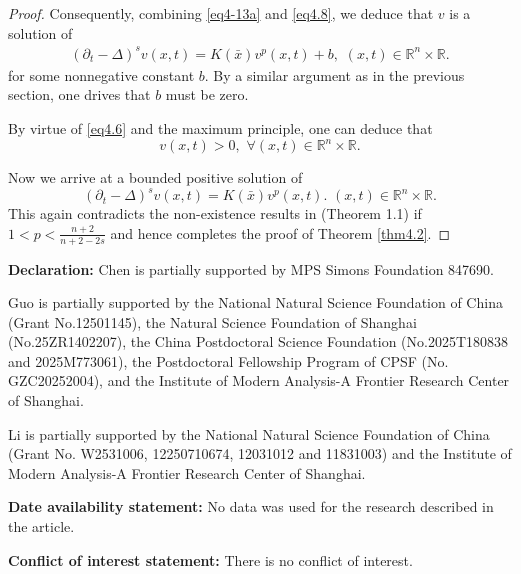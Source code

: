 \documentclass[12pt]{article}
\theoremstyle{remark}
\numberwithin{equation}{section}
\newcommand{\R}{\mathbb{R}}
\begin{document}
\begin{proof}
Consequently, combining \eqref{eq4-13a} and \eqref{eq4.8}, we deduce that $v$ is a solution of
\begin{eqnarray}\label{eq4.9}
(\partial_t-\Delta)^s v(x,t)=K(\bar x) v^p(x,t) + b,\,\, (x,t) \in \mathbb{R}^n \times \R.
\end{eqnarray}
for some nonnegative constant $b$. By a similar argument as in the previous section, one drives that
$b$ must be zero.

By virtue of \eqref{eq4.6} and  the maximum principle,
one can deduce that
$$v(x,t)>0,\,\, \forall (x,t) \in \mathbb{R}^n \times \R.$$

Now we arrive at a bounded positive solution of
$$(\partial_t-\Delta)^s v(x,t)=K(\bar x) v^p(x,t).\,\, (x,t) \in \mathbb{R}^n \times \R.$$
This again contradicts the non-existence results in \cite{FP} (Theorem 1.1) if $1< p < \frac{n+2}{n+2-2s}$ and hence completes
the proof of Theorem \ref{thm4.2}.
\end{proof}


{\bf{Declaration:}} Chen is
 partially supported by MPS Simons Foundation 847690.

 
 Guo is partially supported by the National Natural Science Foundation of China (Grant No.12501145), the Natural Science Foundation of Shanghai (No.25ZR1402207),   the China Postdoctoral Science Foundation (No.2025T180838 and 2025M773061), the Postdoctoral Fellowship Program of CPSF (No. GZC20252004), and the Institute of Modern Analysis-A Frontier Research Center of Shanghai.

 Li is  partially supported by the National Natural Science Foundation of China (Grant No. W2531006, 12250710674, 12031012 and 11831003) and the Institute of Modern Analysis-A Frontier Research Center of Shanghai.
 \medskip


{\bf{Date availability statement:}} No data was used for the research described in the article.
\medskip

{\bf{Conflict of interest statement:}} There is no conflict of interest.
\end{document}
